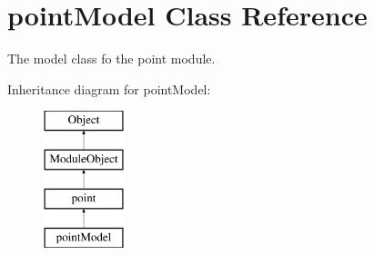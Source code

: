 \hypertarget{classpointModel}{\section{point\+Model Class Reference}
\label{classpointModel}
}


The model class fo the point module.  


Inheritance diagram for point\+Model\+:\begin{figure}[H]
\begin{center}
\leavevmode
\includegraphics[height=4.000000cm]{classpointModel}
\end{center}
\end{figure}
